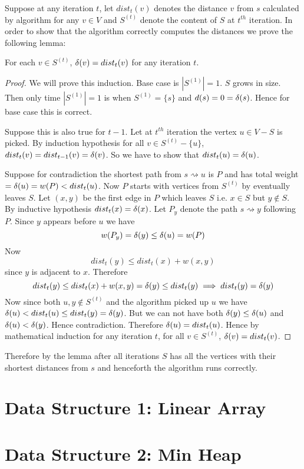 Suppose at any iteration $t$, let $dist_t(v)$ denotes the distance $v$ from $s$ calculated by algorithm for any $v\in V$ and $S^{(t)}$ denote the content of $S$ at $t^{th}$ iteration. In order to show that the algorithm correctly computes the distances we prove the following lemma:
\begin{Theorem}{}{}
	For each $v\in S^{(t)}$, $\delta(v)=dist_t(v)$ for any iteration $t$.
\end{Theorem}
\begin{proof}
	We will prove this induction. Base case is $|S^{(1)}|=1$. $S$ grows in size. Then only time $|S^{(1)}|=1$ is when $S^{(1)}=\{s\}$ and $d(s)=0=\delta(s)$. Hence for base case this is correct.

	Suppose this is also true for $t-1$. Let at $t^{th}$ iteration the vertex $u\in V-S$ is picked. By induction hypothesis for all $v\in S^{(t)}-\{u\}$, $dist_t(v)=dist_{t-1}(v)=\delta(v)$. So we have to show that $dist_{t}(u)=\delta(u)$.

	Suppose for contradiction the shortest path from $s\rightsquigarrow u$ is $P$ and has total weight $=\delta(u)=w(P)<dist_t(u)$. Now $P$ starts with vertices from $S^{(t)}$ by eventually leaves $S$. Let $(x,y)$ be the first edge in $P$ which leaves $S$ i.e. $x\in S$ but $y\notin S$. By inductive hypothesis $dist_t(x)=\delta(x)$. Let $P_y$ denote the path $s\rightsquigarrow y$ following $P$. Since $y$ appears before $u$ we have $$w(P_y)=\delta(y)\leq \delta(u)=w(P)$$Now $$dist_t(y)\leq dist_t(x)+w(x,y)$$ since $y$ is adjacent to $x$. Therefore $$dist_t(y)\leq dist_t(x)+w(x,y)=\delta(y)\leq dist_t(y)\implies dist_t(y)=\delta(y)$$Now since both $u,y\notin S^{(t)}$ and the algorithm picked up $u$ we have $\delta(u)<dist_t(u)\leq dist_t(y)=\delta(y)$. But we can not have both $\delta(y)\leq \delta(u)$ and $\delta(u)<\delta(y)$. Hence contradiction. Therefore $\delta(u)=dist_t(u)$. Hence by mathematical induction for any iteration $t$, for all $v\in S^{(t)}$, $\delta(v)=dist_t(v)$.
\end{proof}

Therefore by the lemma  after all iterations $S$ has all the vertices with their shortest distances from $s$ and henceforth the algorithm runs correctly.


\section{Data Structure 1: Linear Array}

\section{Data Structure 2: Min Heap}

